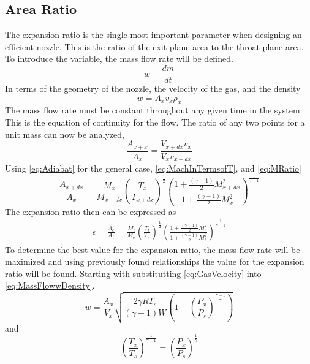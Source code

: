\subsection{Area Ratio}
The expansion ratio is the single most important parameter when designing an efficient nozzle. This is the ratio of the exit plane area to the throat plane area. To introduce the variable, the mass flow rate will be defined.
\begin{equation}\label{eq:MassFlow}
w=\frac{dm}{dt}
\end{equation}
In terms of the geometry of the nozzle, the velocity of the gas, and the density
\begin{equation}
w=A_xv_x\rho_x
\end{equation}%
The mass flow rate must be constant throughout any given time in the system. This is the equation of continuity for the flow. The ratio of any two points for a unit mass can now be analyzed,
\begin{equation}\label{eq:MassFlowwDensity}
\frac{A_{x+x}}{A_x}=\frac{V_{x+dx}v_x}{V_xv_{x+dx}}
\end{equation}
Using \ref{eq:Adiabat} for the general case, \ref{eq:MachInTermsofT}, and \ref{eq:MRatio}
\begin{equation}
\frac{A_{x+dx}}{A_x}=\frac{M_x}{M_{x+dx}}\left(\frac{T_x}{T_{x+dx}}\right)^\frac{1}{2}\left(\frac{1+\frac{(\gamma-1)}{2}M_{x+dx}^2}{1+\frac{(\gamma-1)}{2}M_x^2}\right)^{\frac{1}{\gamma-1}}
\end{equation}
The expansion ratio then can be expressed as
\begin{align}
\epsilon=\frac{A_e}{A_t}=\frac{M_t}{M_e}\left(\frac{T_t}{T_e}\right)^\frac{1}{2}\left(\frac{1+\frac{(\gamma-1)}{2}M_e^2}{1+\frac{(\gamma-1)}{2}M_t^2}\right)^{\frac{1}{\gamma-1}}
\end{align}%
To determine the best value for the expansion ratio, the mass flow rate will be maximized and using previously found relationships the value for the expansion ratio will be found. Starting with substitutting \ref{eq:GasVelocity} into \ref{eq:MassFlowwDensity}.
\begin{equation}\label{eq:WforAll}
w=\frac{A_x}{V_x}\sqrt{\frac{2\gamma RT_s}{(\gamma-1)W}\left(1-\left(\frac{P_x}{P_s}\right)^{\frac{\gamma-1}{\gamma}}\right)}
\end{equation}
and
\begin{equation}\label{eq:TtoP}
\left(\frac{T_x}{T_s}\right)^{\frac{1}{\gamma-1}}=\left(\frac{P_x}{P_s}\right)^{\frac{1}{\gamma}}
\end{equation}
